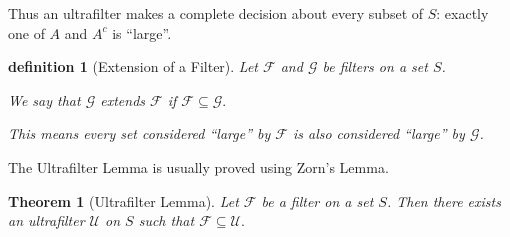 \documentclass[10pt,a4paper]{book}
\newtheorem{definition}{definition}[section]
\newtheorem{theorem}{Theorem}[section]
\begin{document}
Thus an ultrafilter makes a complete decision about every subset of $S$:
exactly one of $A$ and $A^c$ is ``large''.




\begin{definition}[Extension of a Filter]
    Let $\mathcal{F}$ and $\mathcal{G}$ be filters on a set $S$.

    We say that $\mathcal{G}$ extends $\mathcal{F}$ if
    $
        \mathcal{F}\subseteq \mathcal{G}.
    $

    This means every set considered ``large'' by $\mathcal{F}$ is also considered
    ``large'' by $\mathcal{G}$.
\end{definition}


The Ultrafilter Lemma is usually proved using Zorn's Lemma.

\begin{theorem}[Ultrafilter Lemma]
    Let $\mathcal{F}$ be a filter on a set $S$. Then there exists an ultrafilter $\mathcal{U}$ on $S$ such that
    $
        \mathcal{F}\subseteq\mathcal{U}.
    $
\end{theorem}
\end{document}
